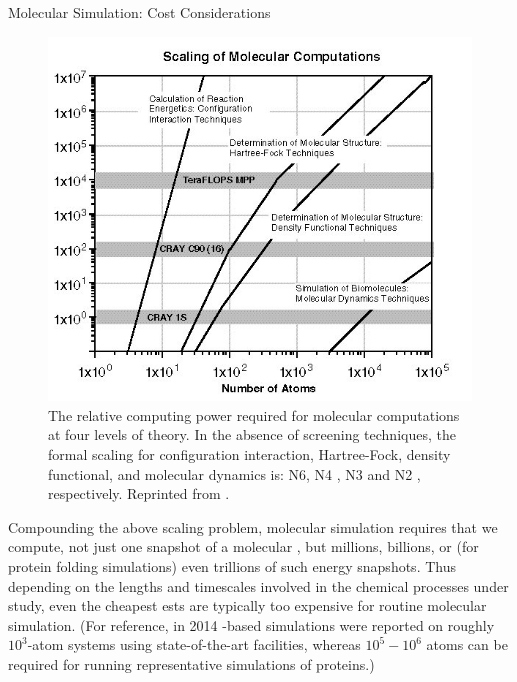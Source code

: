 \begin{section}{Molecular Simulation: Cost Considerations}
\begin{figure}
\centering
\includegraphics[width=\textwidth]{intro/scale.png}
\caption{
The relative computing power required for molecular computations at four
levels of theory. In the absence of screening techniques, the formal scaling
for configuration interaction, Hartree-Fock, density functional, and molecular
dynamics is: N6, N4 , N3 and N2 , respectively.
Reprinted from .
    }
\label{fig:intro-scaling}
\end{figure}

Compounding the above scaling problem, molecular simulation requires that we
compute,
not just one snapshot of a molecular \pes, but millions, billions, or 
(for protein folding simulations) even trillions of such energy snapshots.
Thus depending on the lengths and timescales
involved in the chemical processes under study, even the cheapest \dft \glspl{est}
are typically too expensive for routine molecular simulation.
(For reference, in 2014 \dft-based simulations were reported on 
roughly $10^3$-atom systems using state-of-the-art facilities,
\cite{Ballone2014}
whereas $10^5-10^6$ atoms can be required for running representative
simulations of proteins.\cite{Karplus2002,Lane2013})


\end{section}
